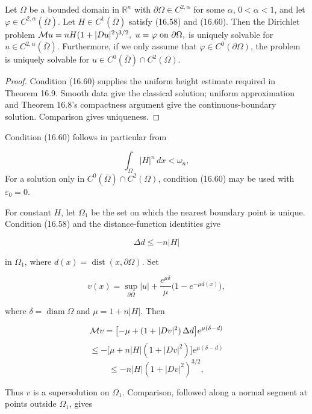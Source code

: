 \begin{theorem}\label{gilbarg-trudinger.thm.16.10.prescribed-mean-curvature-dirichlet}
Let $\Omega$ be a bounded domain in $\mathbb{R}^n$ with $\partial\Omega \in C^{2,\alpha}$ for some $\alpha$,
$0<\alpha<1$, and let $\varphi \in C^{2,\alpha}(\overline{\Omega})$. Let $H \in C^1(\overline{\Omega})$ satisfy (16.58) and (16.60). Then
the Dirichlet problem $\mathcal{M} u = nH(1+|Du|^2)^{3/2},\ u=\varphi\ \text{on }\partial\Omega,$ is uniquely solvable
for $u \in C^{2,\alpha}(\overline{\Omega})$. Furthermore, if we only assume that $\varphi \in C^0(\partial\Omega)$, the problem is
uniquely solvable for $u \in C^0(\overline{\Omega}) \cap C^2(\Omega)$.
\end{theorem}
\begin{proof}
\sketch Condition (16.60) supplies the uniform height estimate required in Theorem 16.9. Smooth data give the classical solution; uniform approximation and Theorem 16.8's compactness argument give the continuous-boundary solution. Comparison gives uniqueness.
\end{proof}

Condition (16.60) follows in particular from

\begin{equation}\tag{16.61}
\int_\Omega |H|^n\,dx < \omega_n,
\end{equation}
For a solution only in $C^0(\overline\Omega)\cap C^2(\Omega)$, condition
(16.60) may be used with $\varepsilon_0=0$.

For constant $H$, let $\Omega_1$ be the set on which the nearest boundary
point is unique.  Condition (16.58) and the distance-function identities give

\[
\Delta d \le -n|H|
\]

in $\Omega_1$, where $d(x)=\operatorname{dist}(x,\partial\Omega)$.  Set

\[
 v(x)=\sup_{\partial\Omega}|u|+\frac{e^{\mu\delta}}{\mu}\bigl(1-e^{-\mu d(x)}\bigr),
\]

where $\delta=\operatorname{diam}\Omega$ and $\mu=1+n|H|$.  Then

\[
\mathcal{M} v = \bigl[-\mu + (1+|Dv|^2)\,\Delta d\bigr]e^{\mu(\delta-d)}
\]
\[
\le -\bigl[\mu+n|H|(1+|Dv|^2)\bigr]e^{\mu(\delta-d)}
\]
\[
\le -n|H|(1+|Dv|^2)^{3/2},
\]

Thus $v$ is a supersolution on $\Omega_1$.  Comparison, followed along a
normal segment at points outside $\Omega_1$, gives

